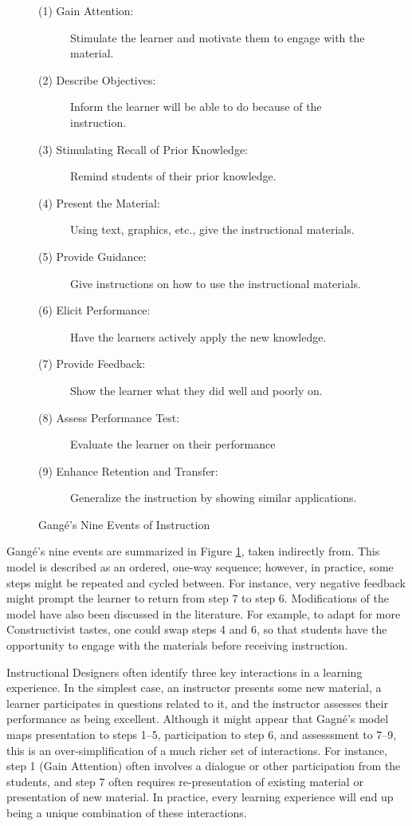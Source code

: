 \begin{figure}
\begin{description}
	\item[(1) Gain Attention:] Stimulate the learner and motivate them to engage with the material.
	\item[(2) Describe Objectives:] Inform the learner will be able to do because of the instruction.
	\item[(3) Stimulating Recall of Prior Knowledge:] Remind students of their prior knowledge.
	\item[(4) Present the Material:] Using text, graphics, etc., give the instructional materials.
	\item[(5) Provide Guidance:] Give instructions on how to use the instructional materials.
	\item[(6) Elicit Performance:] Have the learners actively apply the new knowledge.
	\item[(7) Provide Feedback:] Show the learner what they did well and poorly on.
	\item[(8) Assess Performance Test:] Evaluate the learner on their performance
	\item[(9) Enhance Retention and Transfer:] Generalize the instruction by showing similar applications.
\end{description}
\caption{Gang\'{e}'s Nine Events of Instruction}
\label{gange-events}
\end{figure}

Gang\'{e}'s nine events are summarized in Figure \ref{gange-events}, taken indirectly from\cite{gagne1985conditions}. This model is described as an ordered, one-way sequence; however, in practice, some steps might be repeated and cycled between. For instance, very negative feedback might prompt the learner to return from step 7 to step 6. Modifications of the model have also been discussed in the literature. For example, to adapt for more Constructivist tastes, one could swap steps 4 and 6, so that students have the opportunity to engage with the materials before receiving instruction.

Instructional Designers often identify three key interactions in a learning experience. In the simplest case, an instructor presents some new material, a learner participates in questions related to it, and the instructor assesses their performance as being excellent. Although it might appear that Gagn\'{e}'s model maps presentation to steps 1--5, participation to step 6, and assesssment to 7--9, this is an over-simplification of a much richer set of interactions. For instance, step 1 (Gain Attention) often involves a dialogue or other participation from the students, and step 7 often requires re-presentation of existing material or presentation of new material. In practice, every learning experience will end up being a unique combination of these interactions.

